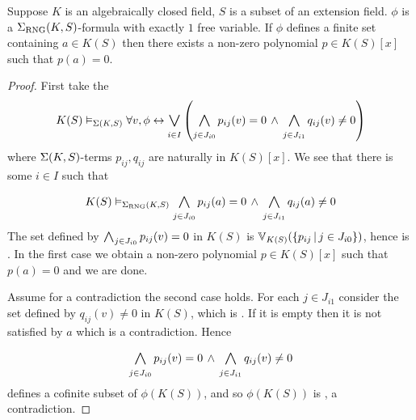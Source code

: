 \begin{lem}
    Suppose $K$ is an algebraically closed field, 
    $S$ is a subset of an extension field.
    $\phi$ is a $\Sigma_{\mathrm{RNG}}(K,S)$-formula with exactly $1$ free variable.
    If $\phi$ defines a finite set containing $a \in K(S)$ 
    then there exists a non-zero polynomial $p \in K(S)[x]$ such that 
    $p(a) = 0$.
\end{lem}
\begin{proof}
    First take the 
    \[K(S) \model{\Si(K,S)} \forall v, \phi \IFF \bigor{i \in I}{} 
        \brkt{\bigand{j \in J_{i0}}{} p_{ij}(v) = 0 \AND 
        \bigand{j \in J_{i1}}{} q_{ij}(v) \ne 0}\]
    where $\Sigma(K,S)$-terms $p_{ij},q_{ij}$ are naturally 
     in $K(S)[x]$.
    We see that there is some $i \in I$ such that 
    \[K(S) \model{\Si_\RNG(K,S)} 
        \bigand{j \in J_{i0}}{} p_{ij}(a) = 0 \AND 
        \bigand{j \in J_{i1}}{} q_{ij}(a) \ne 0
    \]
    The set defined by $\bigand{j \in J_{i0}}{} p_{ij}(v) = 0$ in $K(S)$
    is $\mathbb{V}_{K(S)}(\left\{p_{ij} \,|\, j \in J_{i0}\right\})$,
    hence is .
    In the first case we obtain a non-zero polynomial $p \in K(S)[x]$ 
    such that $p(a) = 0$ and we are done.

    Assume for a contradiction the second case holds.
    For each $j \in J_{i1}$ 
    consider the set defined by $q_{ij}(v) \ne 0$ in $K(S)$,
    which is .
    If it is empty then it is not satisfied by $a$ which is a contradiction.
    Hence 
    \[
        \bigand{j \in J_{i0}}{} p_{ij}(v) = 0 \AND 
        \bigand{j \in J_{i1}}{} q_{ij}(v) \ne 0
    \]
    defines a cofinite subset of $\phi(K(S))$, and so $\phi(K(S))$ is 
    , a contradiction.
\end{proof}

